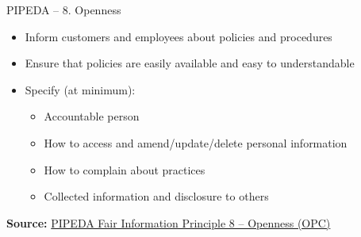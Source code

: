 \documentclass[ignorenonframetext,xcolor=x11names]{beamer}
\begin{document}
\begin{frame}{PIPEDA -- 8. Openness}
\begin{itemize}
  \item Inform customers and employees about policies and procedures
  \item Ensure that policies are easily available and easy to understandable
  \item Specify (at minimum):
  \begin{itemize}
     \item Accountable person 
     \item How to access and amend/update/delete personal information
     \item How to complain about practices
     \item Collected information and disclosure to others
  \end{itemize}
\end{itemize}

\vspace{\baselineskip}
\scriptsize \textbf{Source:} \href{https://www.priv.gc.ca/en/privacy-topics/privacy-laws-in-canada/the-personal-information-protection-and-electronic-documents-act-pipeda/p_principle/principles/p_openness/}{PIPEDA Fair Information Principle 8 -- Openness (OPC)}
\end{frame}
\end{document}
